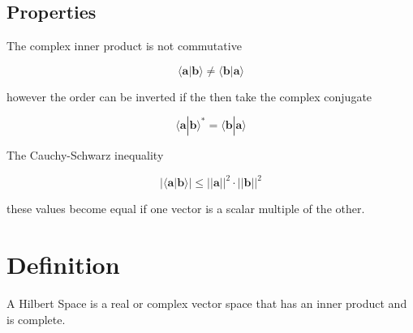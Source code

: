 \documentclass{article}
\newcommand{\braket}[1]{\langle#1\rangle}
\begin{document}
\subsection{Properties}

The complex inner product is not commutative

\[
    \braket{\mathbf{a}|\mathbf{b}} \neq \braket{\mathbf{b}|\mathbf{a}}
\]

however the order can be inverted if the then take the complex conjugate

\[
    \braket{\mathbf{a}|\mathbf{b}}^{*} = \braket{\mathbf{b}|\mathbf{a}}
\]

The Cauchy-Schwarz inequality

\[
    |\braket{\mathbf{a}|\mathbf{b}}| \leq {||\mathbf{a}||}^2 \cdot {||\mathbf{b}||}^2
\]

these values become equal if one vector is a scalar multiple of the other.

\pagebreak

\section{Definition}

A Hilbert Space is a real or complex vector space that has an inner product and is complete.

\end{document}

